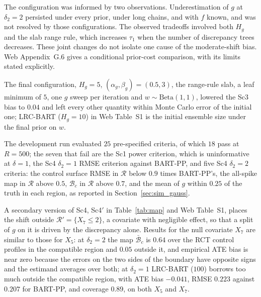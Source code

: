 The configuration was informed by two observations. Underestimation of $g$ at $\delta_2=2$ persisted under every prior, under long chains, and with $f$ known, and was not resolved by those configurations. The observed tradeoffs involved both $H_g$ and the slab range rule, which increases $\tau_1$ when the number of discrepancy trees decreases. These joint changes do not isolate one cause of the moderate-shift bias. Web Appendix~G.6 gives a conditional prior-cost comparison, with its limits stated explicitly.

The final configuration, $H_g=5$, $(\alpha_g,\beta_g)=(0.5,3)$, the range-rule slab, a leaf minimum of $5$, one $g$ sweep per iteration and $w\sim\mathrm{Beta}(1,1)$, lowered the Sc3 bias to $0.04$ and left every other quantity within Monte Carlo error of the initial one; LRC-BART ($H_g=10$) in Web Table~S1 is the initial ensemble size under the final prior on $w$.

The development run evaluated $25$ pre-specified criteria, of which $18$ pass at $R=500$; the seven that fail are the Sc1 power criterion, which is uninformative at $\delta=1$, the Sc4 $\delta_2=1$ RMSE criterion against BART-PP, and five Sc4 $\delta_2=2$ criteria: the control surface RMSE in $\mathcal R$ below $0.9$ times BART-PP's, the all-spike map in $\mathcal R$ above $0.5$, $\mathcal B_c$ in $\mathcal R$ above $0.7$, and the mean of $g$ within $0.25$ of the truth in each region, as reported in Section~\ref{sec:sim_gauss}.

A secondary version of Sc4, Sc4$'$ in Table~\ref{tab:map} and Web Table~S1, places the shift outside $\mathcal R'=\{X_7\le2\}$, a covariate with negligible effect, so that a split of $g$ on it is driven by the discrepancy alone. Results for the null covariate $X_7$ are similar to those for $X_5$: at $\delta_2=2$ the map $\bar{\mathcal B}_c$ is $0.64$ over the RCT control profiles in the compatible region and $0.05$ outside it, and empirical ATE bias is near zero because the errors on the two sides of the boundary have opposite signs and the estimand averages over both; at $\delta_2=1$ LRC-BART ($100$) borrows too much outside the compatible region, with ATE bias $-0.041$, RMSE $0.223$ against $0.207$ for BART-PP, and coverage $0.89$, on both $X_5$ and $X_7$.

